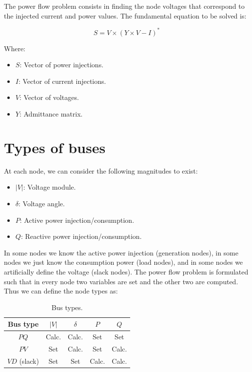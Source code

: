 \documentclass[nols,a4paper,twoside,notoc,fleqn]{tufte-book}
\begin{document}
The power flow problem consists in finding the node voltages that correspond to the injected current and power values. The fundamental equation to be solved is:

\begin{equation}
S = V \times (Y \times V - I)^*
\label{eq:power_flow}
\end{equation}


Where:

\begin{itemize}
\item $S$: Vector of power injections.
\item $I$: Vector of current injections.
\item $V$: Vector of voltages.
\item $Y$: Admittance matrix.
\end{itemize}


\section{Types of buses}

At each node, we can consider the following magnitudes to exist:
\begin{itemize}
	\item $|V|$: Voltage module.
	\item $\delta$: Voltage angle.
	\item $P$: Active power injection/consumption.
	\item $Q$: Reactive power injection/consumption.
\end{itemize}

In some nodes we know the active power injection (generation nodes), in some nodes we just know the consumption power (load nodes), and in some nodes we artificially define the voltage (slack nodes). The power flow problem is formulated such that in every node two variables are set and the other two are computed. Thus we can define the node types as:

\begin{table}[h!]
	\begin{center}
		\begin{tabular}{ccccc}
			\toprule
			
			Bus type & $|V|$ &  $\delta$ & $P$ & $Q$\\
			
			\midrule
			
			$PQ$ & Calc. &  Calc. & Set & Set\\
			$PV$ & Set &  Calc. & Set & Calc.\\
			$VD$ (slack) & Set &  Set & Calc. & Calc.\\
			
			
			\bottomrule
		\end{tabular}
	\end{center}
	\caption{Bus types.}
	\label{bus__types}
\end{table}
\end{document}
